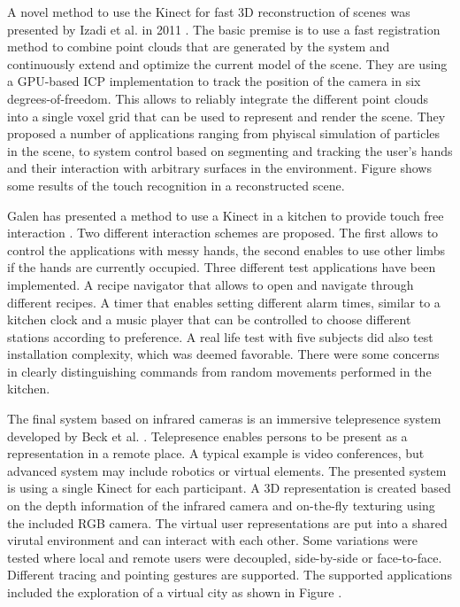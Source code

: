 A novel method to use the Kinect for fast 3D reconstruction of scenes was presented by Izadi et al. in 2011 \cite{Izadi2011}. The basic premise is to use a fast registration method to combine point clouds that are generated by the system and continuously extend and optimize the current model of the scene. They are using a GPU-based ICP implementation to track the position of the camera in six degrees-of-freedom. This allows to reliably integrate the different point clouds into a single voxel grid that can be used to represent and render the scene. They proposed a number of applications ranging from phyiscal simulation of particles in the scene, to system control based on segmenting and tracking the user's hands and their interaction with arbitrary surfaces in the environment. Figure  shows some results of the touch recognition in a reconstructed scene.

Galen has presented a method to use a Kinect in a kitchen to provide touch free interaction \cite{panger2012kinect}. Two different interaction schemes are proposed. The first allows to control the applications with messy hands, the second enables to use other limbs if the hands are currently occupied. Three different test applications have been implemented. A recipe navigator that allows to open and navigate through different recipes. A timer that enables setting different alarm times, similar to a kitchen clock and a music player that can be controlled to choose different stations according to preference. A real life test with five subjects  did also test installation complexity, which was deemed favorable. There were some concerns in clearly distinguishing commands from random movements performed in the kitchen.

The final system based on infrared cameras is an immersive telepresence system developed by Beck et al. \cite{beck2013immersive}. Telepresence enables persons to be present as a representation in a remote place. A typical example is video conferences, but advanced system may include robotics or virtual elements. The presented system is using a single Kinect for each participant. A 3D representation is created based on the depth information of the infrared camera and on-the-fly texturing using the included RGB camera. The virtual user representations are put into a shared virutal environment and can interact with each other. Some variations were tested where local and remote users were decoupled, side-by-side or face-to-face. Different tracing and pointing gestures are supported. The supported applications included the exploration of a virtual city as shown in Figure .

